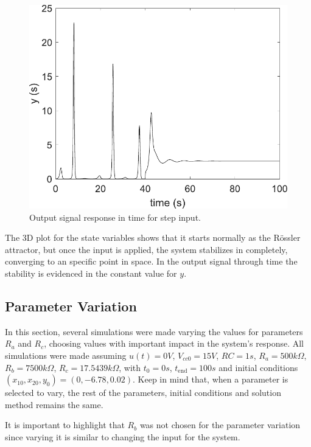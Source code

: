     \begin{figure}[H]
        \centering
        \includegraphics[scale=0.4]{figs/OutStepInput.pdf}
        \caption{Output signal response in time for step input.}
        \label{fig:outStep}
    \end{figure}
    
    The 3D plot for the state variables shows that it starts normally as the Rössler attractor, but once the input is applied, the system stabilizes in completely, converging to an specific point in space. In the output signal through time the stability is evidenced in the constant value for $y$. 
    
    \subsection{Parameter Variation}
    In this section, several simulations were made varying the values for parameters $R_a$ and $R_c$, choosing values with important impact in the system's response. All simulations were made assuming $u(t)=0V$, $V_{cc0}=15V$, $RC=1s$, $R_a=500k\Omega$, $R_b=7500k\Omega$, $R_c=17.5439k\Omega$, with $t_0=0s$, $t_{\text{end}}=100s$ and initial conditions $(x_{10},x_{20},y_{0})=(0,-6.78,0.02)$. Keep in mind that, when a parameter is selected to vary, the rest of the parameters, initial conditions and solution method remains the same.
    
    It is important to highlight that $R_b$ was not chosen for the parameter variation since varying it is similar to changing the input for the system.
    
